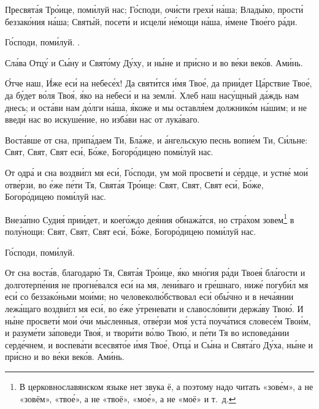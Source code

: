 \begin{mymulticols}

Пресвят\'{а}я Тр\'{о}ице, пом\'{и}луй нас; Г\'{о}споди, оч\'{и}сти грех\'{и} н\'{а}ша; Влад\'{ы}ко, прост\'{и} беззак\'{о}ния н\'{а}ша; Свят\'{ы}й, посет\'{и} и исцел\'{и} н\'{е}мощи н\'{а}ша, \'{и}мене Тво\'{е}го р\'{а}ди.

Г\'{о}споди, пом\'{и}луй. .

Сл\'{а}ва Отц\'{у} и С\'{ы}ну и Свят\'{о}му Д\'{у}ху, и н\'{ы}не и пр\'{и}сно и во в\'{е}ки век\'{о}в. Ам\'{и}нь.


\'{О}тче наш, \'{И}же ес\'{и} на небес\'{е}х! Да свят\'{и}тся \'{и}мя Тво\'{е}, да при\'{и}дет Ц\'{а}рствие Тво\'{е}, да б\'{у}дет в\'{о}ля Тво\'{я}, \'{я}ко на небес\'{и} и на земл\'{и}. Хлеб наш нас\'{у}щный д\'{а}ждь нам днесь; и ост\'{а}ви нам д\'{о}лги н\'{а}ша, \'{я}коже и мы оставл\'{я}ем должник\'{о}м н\'{а}шим; и не введ\'{и} нас во искуш\'{е}ние, но изб\'{а}ви нас от лук\'{а}ваго.


Вост\'{а}вше от сна, прип\'{а}даем Ти, Бл\'{а}же, и \'{а}нгельскую песнь вопи\'{е}м Ти, С\'{и}льне: Свят, Свят, Свят ес\'{и}, Б\'{о}же, Богор\'{о}дицею пом\'{и}луй нас.

\slavan

От одр\'{а} и сна воздв\'{и}гл мя ес\'{и}, Г\'{о}споди, ум мой просвет\'{и} и с\'{е}рдце, и устн\'{е} мо\'{и} отв\'{е}рзи, во \'{е}же п\'{е}ти Тя, Свят\'{а}я Тр\'{о}ице: Свят, Свят, Свят ес\'{и}, Б\'{о}же, Богор\'{о}дицею пом\'{и}луй нас.

\inynen

Внез\'{а}пно Суди\'{я} при\'{и}дет, и коег\'{о}ждо де\'{я}ния обнаж\'{а}тся, но стр\'{а}хом зовем\footnote{В церковнославянском языке нет звука ё, а поэтому надо читать «зов\'{е}м», а не «зовём», «тво\'{е}», а не «твоё», «мо\'{е}», а не «моё» и т.~д.} в пол\'{у}нощи: Свят, Свят, Свят ес\'{и}, Б\'{о}же, Богор\'{о}дицею пом\'{и}луй нас.

Г\'{о}споди, пом\'{и}луй. 


От сна вост\'{а}в, благодар\'{ю} Тя, Свят\'{а}я Тр\'{о}ице, \'{я}ко мн\'{о}гия р\'{а}ди Твое\'{я} бл\'{а}гости и долготерп\'{е}ния не прогн\'{е}вался ес\'{и} на мя, лен\'{и}ваго и гр\'{е}шнаго, ниж\'{е} погуб\'{и}л мя ес\'{и} со беззак\'{о}ньми мо\'{и}ми; но человекол\'{ю}бствовал ес\'{и} об\'{ы}чно и в неч\'{а}янии леж\'{а}щаго воздв\'{и}гл мя ес\'{и}, во \'{е}же \'{у}треневати и славосл\'{о}вити держ\'{а}ву Тво\'{ю}. И н\'{ы}не просвет\'{и} мо\'{и} \'{о}чи м\'{ы}сленныя, отв\'{е}рзи мо\'{я} уст\'{а} поуч\'{а}тися словес\'{е}м Тво\'{и}м, и разум\'{е}ти з\'{а}поведи Тво\'{я}, и твор\'{и}ти в\'{о}лю Тво\'{ю}, и п\'{е}ти Тя во исповед\'{а}нии серд\'{е}чнем, и воспев\'{а}ти всесвят\'{о}е \'{и}мя Тво\'{е}, Отц\'{а} и С\'{ы}на и Свят\'{а}го Д\'{у}ха, н\'{ы}не и пр\'{и}сно и во в\'{е}ки век\'{о}в. Ам\'{и}нь.


\end{mymulticols}
